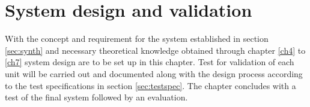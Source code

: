 \chapter{System design and validation} \label{ch8}
With the concept and requirement for the system established in section \ref{sec:synth} and necessary theoretical knowledge obtained through chapter \ref{ch4} to \ref{ch7} system design are to be set up in this chapter. Test for validation of each unit will be carried out and documented along with the design process according to the test specifications in section \ref{sec:testspec}. The chapter concludes with a test of the final system followed by an evaluation.   


